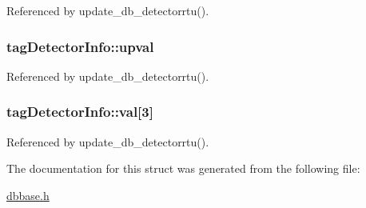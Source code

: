 Referenced by update\-\_\-db\-\_\-detectorrtu().

\hypertarget{structtagDetectorInfo_af8bb08e2acbcc9f134be7feaa0e7d2ef}{
\subsubsection[{upval}]{ tag\-Detector\-Info\-::upval}}\label{structtagDetectorInfo_af8bb08e2acbcc9f134be7feaa0e7d2ef}


Referenced by update\-\_\-db\-\_\-detectorrtu().

\hypertarget{structtagDetectorInfo_a7dd75ea997381e7c732247ea01ab5550}{
\subsubsection[{val}]{ tag\-Detector\-Info\-::val\mbox{[}3\mbox{]}}}\label{structtagDetectorInfo_a7dd75ea997381e7c732247ea01ab5550}


Referenced by update\-\_\-db\-\_\-detectorrtu().



The documentation for this struct was generated from the following file\-:\begin{DoxyCompactItemize}
\item 
\hyperlink{dbbase_8h}{dbbase.\-h}\end{DoxyCompactItemize}
